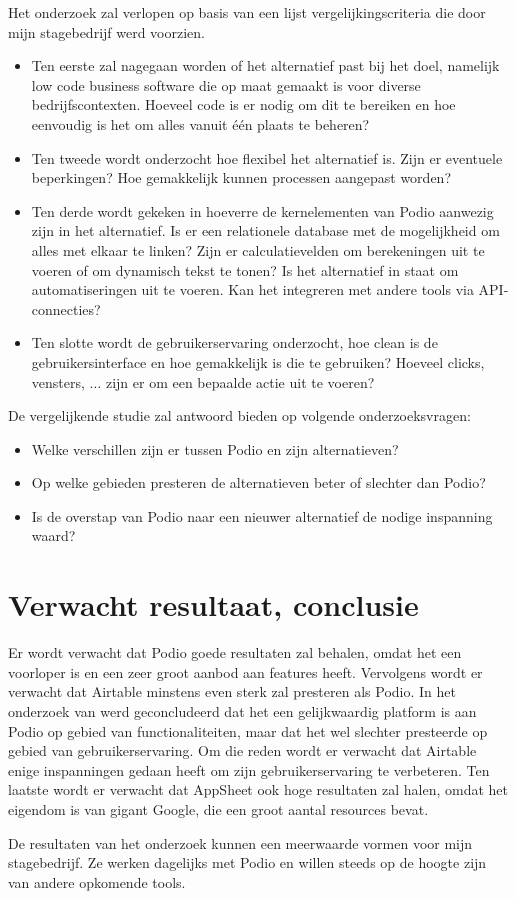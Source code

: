 Het onderzoek zal verlopen op basis van een lijst vergelijkingscriteria die door mijn stagebedrijf werd voorzien. 

\begin{itemize}
    \item Ten eerste zal nagegaan worden of het alternatief past bij het doel, namelijk low code business software die op maat gemaakt is voor diverse bedrijfscontexten. Hoeveel code is er nodig om dit te bereiken en hoe eenvoudig is het om alles vanuit één plaats te beheren?
    \item Ten tweede wordt onderzocht hoe flexibel het alternatief is. Zijn er eventuele beperkingen? Hoe gemakkelijk kunnen processen aangepast worden?
    \item Ten derde wordt gekeken in hoeverre de kernelementen van Podio aanwezig zijn in het alternatief. Is er een relationele database met de mogelijkheid om alles met elkaar te linken?  Zijn er calculatievelden om berekeningen uit te voeren of om dynamisch tekst te tonen? Is het alternatief in staat om automatiseringen uit te voeren. Kan het integreren met andere tools via API-connecties?
    \item Ten slotte wordt de gebruikerservaring onderzocht, hoe clean is de gebruikersinterface en hoe gemakkelijk is die te gebruiken? Hoeveel clicks, vensters, $\ldots$ zijn er om een bepaalde actie uit te voeren?
\end{itemize}

De vergelijkende studie zal antwoord bieden op volgende onderzoeksvragen:

\begin{itemize}
    \item Welke verschillen zijn er tussen Podio en zijn alternatieven?
    \item Op welke gebieden presteren de alternatieven beter of slechter dan Podio?
    \item Is de overstap van Podio naar een nieuwer alternatief de nodige inspanning waard?
\end{itemize}

\section{Verwacht resultaat, conclusie}%
\label{sec:verwachte_resultaten}

Er wordt verwacht dat Podio goede resultaten zal behalen, omdat het een voorloper is en een zeer groot aanbod aan features heeft. Vervolgens wordt er verwacht dat Airtable minstens even sterk zal presteren als Podio. In het onderzoek van \textcite{Spitaels2022} werd geconcludeerd dat het een gelijkwaardig platform is aan Podio op gebied van functionaliteiten, maar dat het wel slechter presteerde op gebied van gebruikerservaring. Om die reden wordt er verwacht dat Airtable enige inspanningen gedaan heeft om zijn gebruikerservaring te verbeteren. Ten laatste wordt er verwacht dat AppSheet ook hoge resultaten zal halen, omdat het eigendom is van gigant Google, die een groot aantal resources bevat.

De resultaten van het onderzoek kunnen een meerwaarde vormen voor mijn stagebedrijf. Ze werken dagelijks met Podio en willen steeds op de hoogte zijn van andere opkomende tools.

